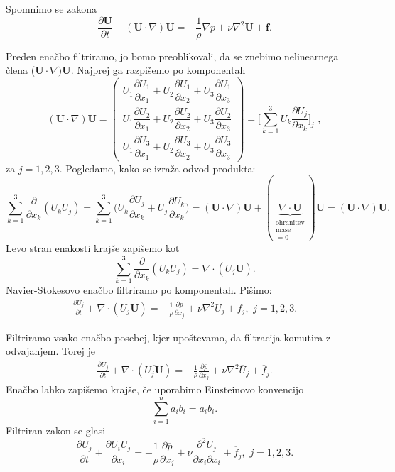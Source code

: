 \documentclass[mat2, tisk]{fmfdelo}
\newcommand{\bd}{\textbf}
\begin{document}
Spomnimo se zakona
$$
\frac{\partial \bd{U}}{\partial t} + (\bd{U}\cdot \nabla)\bd{U} = -\frac{1}{\rho} \nabla p + \nu\nabla^2 \bd{U} + \bd{f}.
$$

\noindent
Preden enačbo filtriramo, jo bomo preoblikovali, da se znebimo nelinearnega člena ($\bd{U}\cdot \nabla)\bd{U}$.
Najprej ga razpišemo po komponentah 
\renewcommand{\arraystretch}{2.5} %
\[
(\bd{U} \cdot \nabla) \bd{U} =
\begin{pmatrix}
U_1 \dfrac{\partial U_1}{\partial x_1} + U_2 \dfrac{\partial U_1}{\partial x_2} + U_3 \dfrac{\partial U_1}{\partial x_3} \\
U_1 \dfrac{\partial U_2}{\partial x_1} + U_2 \dfrac{\partial U_2}{\partial x_2} + U_3 \dfrac{\partial U_2}{\partial x_3} \\
U_1 \dfrac{\partial U_3}{\partial x_1} + U_2 \dfrac{\partial U_3}{\partial x_2} + U_3 \dfrac{\partial U_3}{\partial x_3}
\end{pmatrix} = \Big[\sum_{k=1}^3 U_k \frac{\partial U_j}{\partial x_k}\Big]_j\,\,,
\]
za $j = 1, 2, 3$. Pogledamo, kako se izraža odvod produkta:
$$
\sum_{k=1}^3 \frac{\partial}{\partial x_k} (U_k U_j) = \sum_{k=1}^3 \Big(U_k\frac{\partial U_j}{\partial x_k}
+ U_j\frac{\partial U_k}{\partial x_k}\Big) = (\bd{U}\cdot \nabla)\bd{U} + (\underbrace{\nabla\cdot \bd{U}}_{\substack{\text{ohranitev}\\{\text{mase}}\\=0}}) \bd{U}
= (\bd{U}\cdot \nabla)\bd{U}.
$$
Levo stran enakosti krajše zapišemo kot
$$
\sum_{k=1}^3 \frac{\partial}{\partial x_k} (U_k U_j) = \nabla \cdot (U_j \bd{U}).
$$
Navier-Stokesovo enačbo filtriramo po komponentah.
Pišimo:
\begin{align*}
\frac{\partial U_j}{\partial t} + \nabla\cdot(U_j \bd{U}) = -\frac{1}{\rho} \frac{\partial p}{\partial x_j} + \nu\nabla^2 U_j + f_j, \,\, j = 1, 2, 3.
\end{align*}

Filtriramo vsako enačbo posebej, kjer upoštevamo, da filtracija komutira z odvajanjem. Torej je
\begin{align*}
  \frac{\partial \overline{U}_j}{\partial t} + \nabla\cdot(\overline{U_j \bd{U}}) = -\frac{1}{\rho} \frac{\partial \overline{p}}{\partial x_j} + \nu\nabla^2 \overline{U}_j + \overline{f}_j.
\end{align*}
Enačbo lahko zapišemo krajše, če uporabimo Einsteinovo konvencijo 
$$
\sum_{i=1}^n a_i b_i = a_i b_i.
$$
Filtriran zakon se glasi
\begin{equation*}
\frac{\partial \overline{U}_j}{\partial t} + \frac{\partial \overline{U_i U_j}}{\partial x_i} = -\frac{1}{\rho} \frac{\partial \overline{p}}{\partial x_j} + \nu \frac{\partial^2 \overline{U}_j}{\partial x_i \partial x_i} + \overline{f}_j,\,\, j = 1, 2, 3.
\end{equation*}
\end{document}

